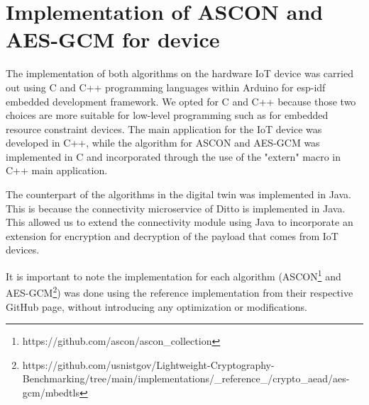 

\section{Implementation of ASCON and AES-GCM for device}





The implementation of both algorithms on the hardware IoT device was carried out using C and C++ programming languages within Arduino for esp-idf embedded development framework. We opted for C and C++ because those two choices are more suitable for low-level programming such as for embedded resource constraint devices. The main application for the IoT device was developed in C++, while the algorithm for ASCON and AES-GCM was implemented in C and incorporated through the use of the "extern" macro in C++ main application.


The counterpart of the algorithms in the digital twin was implemented in Java. This is because the connectivity microservice of Ditto is implemented in Java. This allowed us to extend the connectivity module using Java to incorporate an extension for encryption and decryption of the payload that comes from IoT devices.

It is important to note the implementation for each algorithm (ASCON\footnote{https://github.com/ascon/ascon\_collection} and AES-GCM\footnote{https://github.com/usnistgov/Lightweight-Cryptography-Benchmarking/tree/main/implementations/\_reference\_/crypto\_aead/aes-gcm/mbedtls}) was done using the reference implementation from their respective GitHub page, without introducing any optimization or modifications.